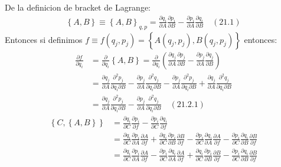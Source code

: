 \documentclass[a4paper]{article}
\begin{document}
    
    \begin{answer}[punto 21]
        De la definicion de bracket de Lagrange:
        \begin{align*}
            \left\{A,B\right\} \equiv \left\{A,B\right\}_{q,p} = \frac{\partial q_i}{\partial A} \frac{\partial p_i}{\partial B} - \frac{\partial p_i}{\partial A} \frac{\partial q_i}{\partial B} \quad (21.1)
        \end{align*}
        Entonces si definimos $f\equiv f(q_j, p_j) = \left\{A(q_j, p_j),B(q_j, p_j)\right\}$ entonces:
        \begin{align*}
            \frac{\partial f}{\partial q_i} &= \frac{\partial}{\partial q_i} \left\{A,B\right\} = \frac{\partial}{\partial q_i} \left(\frac{\partial q_j}{\partial A} \frac{\partial p_j}{\partial B} - \frac{\partial p_j}{\partial A} \frac{\partial q_j}{\partial B}\right)\\
            &= \frac{\partial q_j}{\partial A} \frac{\partial^2 p_j}{\partial q_i \partial B} - \frac{\partial p_j}{\partial A} \frac{\partial^2 q_j}{\partial q_i \partial B} - \frac{\partial p_j}{\partial A} \frac{\partial^2 p_j}{\partial q_i \partial B} + \frac{\partial q_j}{\partial A} \frac{\partial^2 q_j}{\partial q_i \partial B}\\
            &= \frac{\partial q_j}{\partial A} \frac{\partial^2 p_j}{\partial q_i \partial B} - \frac{\partial p_j}{\partial A} \frac{\partial^2 q_j}{\partial q_i \partial B} \quad (21.2.1)        \end{align*}
        \begin{align*}
            \left\{C, \left\{A,B\right\}\right\} &= \frac{\partial q_i}{\partial C} \frac{\partial p_i}{\partial f} - \frac{\partial p_i}{\partial C} \frac{\partial q_i}{\partial f}\\
            &= \frac{\partial q_i}{\partial C} \frac{\partial p_i}{\partial A} \frac{\partial A}{\partial f} + \frac{\partial q_i}{\partial C} \frac{\partial p_i}{\partial B} \frac{\partial B}{\partial f} - \frac{\partial p_i}{\partial C} \frac{\partial q_i}{\partial A} \frac{\partial A}{\partial f} - \frac{\partial p_i}{\partial C} \frac{\partial q_i}{\partial B} \frac{\partial B}{\partial f}\\
            &= \frac{\partial q_i}{\partial C} \frac{\partial p_i}{\partial A} \frac{\partial A}{\partial f} - \frac{\partial p_i}{\partial C} \frac{\partial q_i}{\partial A} \frac{\partial A}{\partial f} + \frac{\partial q_i}{\partial C} \frac{\partial p_i}{\partial B} \frac{\partial B}{\partial f} - \frac{\partial p_i}{\partial C} \frac{\partial q_i}{\partial B} \frac{\partial B}{\partial f}\\

\end{align*}
\end{answer}
\end{document}
